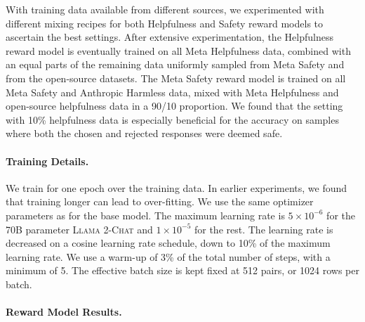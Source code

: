\documentclass{article}
\newcommand{\modelname}{\textsc{Llama 2-Chat}\xspace}
\begin{document}
With training data available from different sources, we experimented with different mixing recipes for both Helpfulness and Safety reward models to ascertain the best settings. 
After extensive experimentation, the Helpfulness reward model is eventually trained on all Meta Helpfulness data, combined with an equal parts of the remaining data uniformly sampled from Meta Safety and from the open-source datasets. 
The Meta Safety reward model is trained on all Meta Safety and Anthropic Harmless data, mixed with Meta Helpfulness and open-source helpfulness data in a 90/10 proportion.
We found that the setting with 10\% helpfulness data is especially beneficial for the accuracy on samples where both the chosen and rejected responses were deemed safe.

\paragraph{Training Details.} 
We train for one epoch over the training data. In earlier experiments, we found that training longer can lead to over-fitting. We use the same optimizer parameters as for the base model. The maximum learning rate is $5\times10^{-6}$ for the 70B parameter \modelname and $1\times10^{-5}$ for the rest. 
The learning rate is decreased on a cosine learning rate schedule, down to 10\% of the maximum learning rate. 
We use a warm-up of 3\% of the total number of steps, with a minimum of 5. The effective batch size is kept fixed at 512 pairs, or 1024 rows per batch. 

\paragraph{Reward Model Results.}
\label{sec:reward_model_results}
\end{document}
